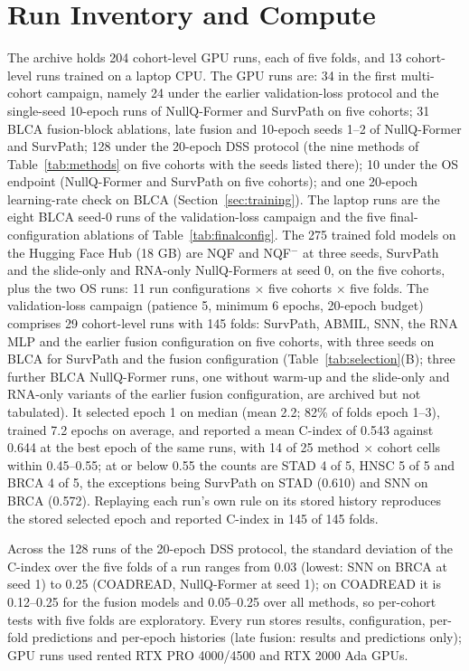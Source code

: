 \documentclass[9pt,journal]{IEEEtran}
\newcommand{\pq}{NullQ-Former}
\newcommand{\pqf}{NQF}
\newcommand{\pqm}{NQF$^{-}$}
\newcommand{\cindex}{C-index}
\begin{document}
\section{Run Inventory and Compute}
\label{sec:runs}
The archive holds 204 cohort-level GPU runs, each of five folds, and 13 cohort-level runs trained on a laptop CPU. The GPU runs are: 34 in the first multi-cohort campaign, namely 24 under the earlier validation-loss protocol and the single-seed 10-epoch runs of \pq{} and SurvPath on five cohorts; 31 BLCA fusion-block ablations, late fusion and 10-epoch seeds 1--2 of \pq{} and SurvPath; 128 under the 20-epoch DSS protocol (the nine methods of Table~\ref{tab:methods} on five cohorts with the seeds listed there); 10 under the OS endpoint (\pq{} and SurvPath on five cohorts); and one 20-epoch learning-rate check on BLCA (Section~\ref{sec:training}). The laptop runs are the eight BLCA seed-0 runs of the validation-loss campaign and the five final-configuration ablations of Table~\ref{tab:finalconfig}. The 275 trained fold models on the Hugging Face Hub (18 GB) are \pqf{} and \pqm{} at three seeds, SurvPath and the slide-only and RNA-only \pq{}s at seed 0, on the five cohorts, plus the two OS runs: 11 run configurations $\times$ five cohorts $\times$ five folds. The validation-loss campaign (patience 5, minimum 6 epochs, 20-epoch budget) comprises 29 cohort-level runs with 145 folds: SurvPath, ABMIL, SNN, the RNA MLP and the earlier fusion configuration on five cohorts, with three seeds on BLCA for SurvPath and the fusion configuration (Table~\ref{tab:selection}(B); three further BLCA \pq{} runs, one without warm-up and the slide-only and RNA-only variants of the earlier fusion configuration, are archived but not tabulated). It selected epoch 1 on median (mean 2.2; 82\% of folds epoch 1--3), trained 7.2 epochs on average, and reported a mean \cindex{} of 0.543 against 0.644 at the best epoch of the same runs, with 14 of 25 method $\times$ cohort cells within 0.45--0.55; at or below 0.55 the counts are STAD 4 of 5, HNSC 5 of 5 and BRCA 4 of 5, the exceptions being SurvPath on STAD (0.610) and SNN on BRCA (0.572). Replaying each run's own rule on its stored history reproduces the stored selected epoch and reported \cindex{} in 145 of 145 folds.

Across the 128 runs of the 20-epoch DSS protocol, the standard deviation of the \cindex{} over the five folds of a run ranges from 0.03 (lowest: SNN on BRCA at seed 1) to 0.25 (COADREAD, \pq{} at seed 1); on COADREAD it is 0.12--0.25 for the fusion models and 0.05--0.25 over all methods, so per-cohort tests with five folds are exploratory. Every run stores results, configuration, per-fold predictions and per-epoch histories (late fusion: results and predictions only); GPU runs used rented RTX PRO 4000/4500 and RTX 2000 Ada GPUs.
\end{document}
